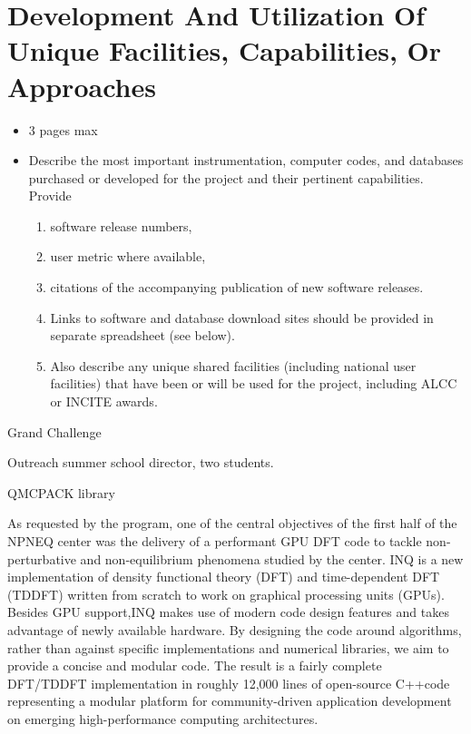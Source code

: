 \section{Development And Utilization Of Unique Facilities, Capabilities, Or Approaches}
\label{sec:development}
{\small\color{red}
\begin{itemize}
\item 3 pages max
    \item Describe the most important instrumentation, computer codes, and databases purchased or developed for the project and their pertinent capabilities. Provide 
    \begin{enumerate}
        \item software release numbers,
        \item user metric where available,
        
        \item citations of the accompanying publication of new software releases.
        \item Links to software and database download sites should be provided in separate spreadsheet (see below).
        \item Also describe any unique shared facilities (including national user facilities) that have been or will be used for the project, including ALCC or INCITE awards.
    \end{enumerate}    
\end{itemize}

}

Grand Challenge 

Outreach summer school director, two students.

QMCPACK library

As requested by the program, one of the central objectives of the first half of the NPNEQ center was the delivery of a performant GPU DFT code to tackle non-perturbative and non-equilibrium phenomena studied by the center.
INQ is a new implementation of density functional theory (DFT) and time-dependent DFT (TDDFT) written from scratch to work on graphical processing units (GPUs).  
Besides GPU support,INQ makes use of modern code design features and takes advantage of newly available hardware.
By designing the code around algorithms, rather than against specific implementations and numerical  libraries, we aim to provide a concise and modular code.
The result is a fairly complete DFT/TDDFT implementation in roughly 12,000 lines of open-source C++code representing a modular platform for community-driven application development on emerging high-performance computing architectures.

